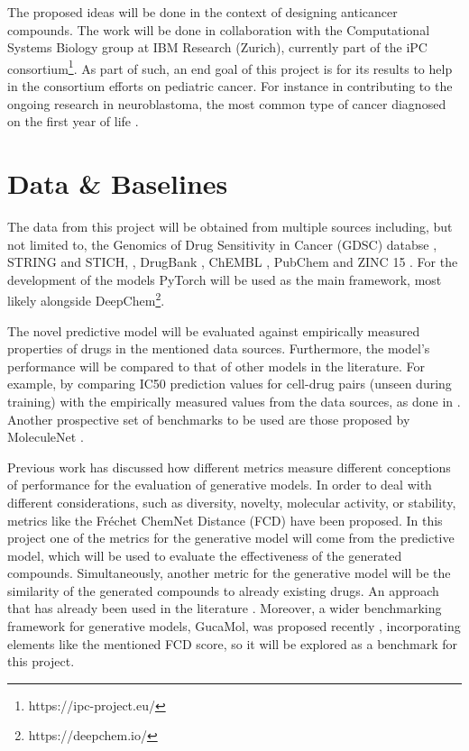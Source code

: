 \documentclass{article}
\begin{document}

The proposed ideas will be done in the context of designing anticancer compounds. The
 work will be done in collaboration with the Computational Systems Biology group at IBM
 Research (Zurich), currently part of the iPC
 consortium\footnote{https://ipc-project.eu/}. As part of such, an end goal of this
 project is for its results to help in the consortium efforts on pediatric cancer. For
 instance in contributing to the ongoing research in neuroblastoma, the most common type
 of cancer diagnosed on the first year of life \cite{Maris2010}.

    \section*{Data \& Baselines}

The data from this project will be obtained from multiple sources including, but not
 limited to, the Genomics of Drug Sensitivity in Cancer (GDSC) databse \cite{Yang2013},
 STRING and STICH, \cite{Szklarczyk2019,Szklarczyk2016}, DrugBank \cite{Wishart2006},
 ChEMBL \cite{Gaulton2017}, PubChem \cite{Kim2019} and ZINC 15 \cite{Sterling2015}. For
 the development of the models PyTorch \cite{Paszke2019} will be used as the main
 framework, most likely alongside DeepChem\footnote{https://deepchem.io/}.

The novel predictive model will be evaluated against empirically measured properties of
 drugs in the mentioned data sources. Furthermore, the model's performance will be
 compared to that of other models in the literature. For example, by comparing IC50
 prediction values for cell-drug pairs (unseen during training) with the empirically
 measured values from the data sources, as done in \cite{Oskooei2019, Joo2019,
 Oskooei2018}. Another prospective set of benchmarks to be used are those proposed by
 MoleculeNet \cite{Wu2018}.

Previous work \cite{Theis2016} has discussed how different metrics measure different
 conceptions of performance for the evaluation of generative models. In order to deal
 with different considerations, such as diversity, novelty, molecular activity, or
 stability, metrics like the Fréchet ChemNet Distance (FCD) \cite{Preuer} have been
 proposed. In this project one of the metrics for the generative model will come from
 the predictive model, which will be used to evaluate the effectiveness of the generated
 compounds. Simultaneously, another metric for the generative model will be the
 similarity of the generated compounds to already existing drugs. An approach that has
 already been used in the literature \cite{Born2019}. Moreover, a wider benchmarking
 framework for generative models, GucaMol, was proposed recently \cite{Brown2019},
 incorporating elements like the mentioned FCD score, so it will be explored as a
 benchmark for this project.
 
\end{document}
